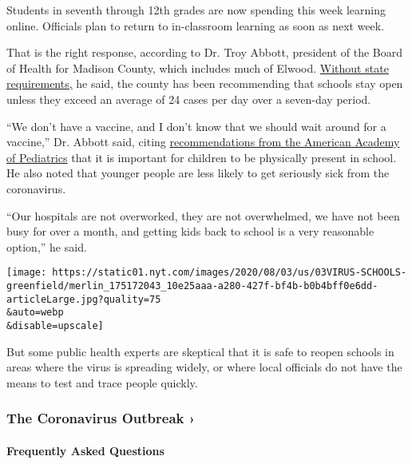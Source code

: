 Students in seventh through 12th grades are now spending this week
learning online. Officials plan to return to in-classroom learning as
soon as next week.

That is the right response, according to Dr. Troy Abbott, president of
the Board of Health for Madison County, which includes much of Elwood.
\href{https://www.indystar.com/story/news/education/2020/08/02/indiana-schools-reopening-how-we-know-districts-safe/5558849002/}{Without
state requirements,} he said, the county has been recommending that
schools stay open unless they exceed an average of 24 cases per day over
a seven-day period.

``We don't have a vaccine, and I don't know that we should wait around
for a vaccine,'' Dr. Abbott said, citing
\href{https://www.nytimes.com/2020/06/30/us/coronavirus-schools-reopening-guidelines-aap.html}{recommendations
from the American Academy of Pediatrics} that it is important for
children to be physically present in school. He also noted that younger
people are less likely to get seriously sick from the coronavirus.

``Our hospitals are not overworked, they are not overwhelmed, we have
not been busy for over a month, and getting kids back to school is a
very reasonable option,'' he said.

\texttt{[image: https://static01.nyt.com/images/2020/08/03/us/03VIRUS-SCHOOLS-greenfield/merlin\_175172043\_10e25aaa-a280-427f-bf4b-b0b4bff0e6dd-articleLarge.jpg?quality=75\\\&auto=webp\\\&disable=upscale]}

But some public health experts are skeptical that it is safe to reopen
schools in areas where the virus is spreading widely, or where local
officials do not have the means to test and trace people quickly.

\href{https://www.nytimes.com/news-event/coronavirus?action=click\&pgtype=Article\&state=default\&region=MAIN_CONTENT_3\&context=storylines_faq}{}

\hypertarget{the-coronavirus-outbreak-}{%
\subsubsection{The Coronavirus Outbreak
›}\label{the-coronavirus-outbreak-}}

\hypertarget{frequently-asked-questions}{%
\paragraph{Frequently Asked
Questions}\label{frequently-asked-questions}}

